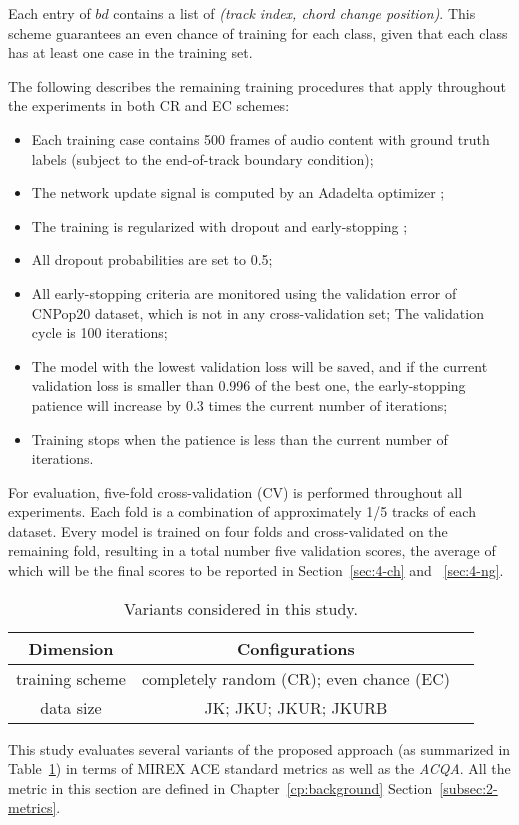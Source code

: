 Each entry of $bd$ contains a list of \textit{(track index, chord change position)}. This scheme guarantees an even chance of training for each class, given that each class has at least one case in the training set.

The following describes the remaining training procedures that apply throughout the experiments in both CR and EC schemes:
\begin{itemize}
	\item Each training case contains 500 frames of audio content with ground truth labels (subject to the end-of-track boundary condition);
	\item The network update signal is computed by an Adadelta optimizer \cite{zeiler2012adadelta};
	\item The training is regularized with dropout \cite{srivastava2014dropout} and early-stopping \cite{prechelt1998early};
	\item All dropout probabilities are set to 0.5;
	\item All early-stopping criteria are monitored using the validation error of CNPop20 dataset, which is not in any cross-validation set; The validation cycle is 100 iterations;
	\item The model with the lowest validation loss will be saved, and if the current validation loss is smaller than 0.996 of the best one, the early-stopping patience will increase by 0.3 times the current number of iterations;
	\item Training stops when the patience is less than the current number of iterations.
\end{itemize}
For evaluation, five-fold cross-validation (CV) is performed throughout all experiments. Each fold is a combination of approximately 1/5 tracks of each dataset. Every model is trained on four folds and cross-validated on the remaining fold, resulting in a total number five validation scores, the average of which will be the final scores to be reported in Section~\ref{sec:4-ch} and ~\ref{sec:4-ng}.

\begin{table}[htb]
	\caption{Variants considered in this study.}
	\centering
	\scriptsize
	\begin{tabular}{|c|c|c|} \hline
		Dimension & Configurations \\ \hline
		training scheme & completely random (CR); even chance (EC) \\ \hline
		data size & JK; JKU; JKUR; JKURB \\ \hline
	\end{tabular}
	\label{tab:4-varexplore}
\end{table}
This study evaluates several variants of the proposed approach (as summarized in Table~\ref{tab:4-varexplore}) in terms of MIREX ACE standard metrics as well as the \textit{ACQA}. All the metric in this section are defined in Chapter~\ref{cp:background} Section~\ref{subsec:2-metrics}.

